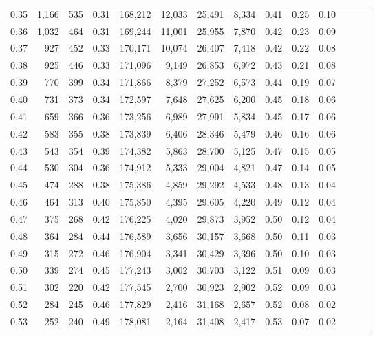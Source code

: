 \begin{tabular}{rrrrrrrrrrrrrr}
0.35 &  1,166 &    535 &  0.31 &  168,212 &   12,033 &  25,491 &   8,334 &  0.41 &  0.25 &      0.10 \\
0.36 &  1,032 &    464 &  0.31 &  169,244 &   11,001 &  25,955 &   7,870 &  0.42 &  0.23 &      0.09 \\
0.37 &    927 &    452 &  0.33 &  170,171 &   10,074 &  26,407 &   7,418 &  0.42 &  0.22 &      0.08 \\
0.38 &    925 &    446 &  0.33 &  171,096 &    9,149 &  26,853 &   6,972 &  0.43 &  0.21 &      0.08 \\
0.39 &    770 &    399 &  0.34 &  171,866 &    8,379 &  27,252 &   6,573 &  0.44 &  0.19 &      0.07 \\
0.40 &    731 &    373 &  0.34 &  172,597 &    7,648 &  27,625 &   6,200 &  0.45 &  0.18 &      0.06 \\
0.41 &    659 &    366 &  0.36 &  173,256 &    6,989 &  27,991 &   5,834 &  0.45 &  0.17 &      0.06 \\
0.42 &    583 &    355 &  0.38 &  173,839 &    6,406 &  28,346 &   5,479 &  0.46 &  0.16 &      0.06 \\
0.43 &    543 &    354 &  0.39 &  174,382 &    5,863 &  28,700 &   5,125 &  0.47 &  0.15 &      0.05 \\
0.44 &    530 &    304 &  0.36 &  174,912 &    5,333 &  29,004 &   4,821 &  0.47 &  0.14 &      0.05 \\
0.45 &    474 &    288 &  0.38 &  175,386 &    4,859 &  29,292 &   4,533 &  0.48 &  0.13 &      0.04 \\
0.46 &    464 &    313 &  0.40 &  175,850 &    4,395 &  29,605 &   4,220 &  0.49 &  0.12 &      0.04 \\
0.47 &    375 &    268 &  0.42 &  176,225 &    4,020 &  29,873 &   3,952 &  0.50 &  0.12 &      0.04 \\
0.48 &    364 &    284 &  0.44 &  176,589 &    3,656 &  30,157 &   3,668 &  0.50 &  0.11 &      0.03 \\
0.49 &    315 &    272 &  0.46 &  176,904 &    3,341 &  30,429 &   3,396 &  0.50 &  0.10 &      0.03 \\
0.50 &    339 &    274 &  0.45 &  177,243 &    3,002 &  30,703 &   3,122 &  0.51 &  0.09 &      0.03 \\
0.51 &    302 &    220 &  0.42 &  177,545 &    2,700 &  30,923 &   2,902 &  0.52 &  0.09 &      0.03 \\
0.52 &    284 &    245 &  0.46 &  177,829 &    2,416 &  31,168 &   2,657 &  0.52 &  0.08 &      0.02 \\
0.53 &    252 &    240 &  0.49 &  178,081 &    2,164 &  31,408 &   2,417 &  0.53 &  0.07 &      0.02 \\

\end{tabular}
